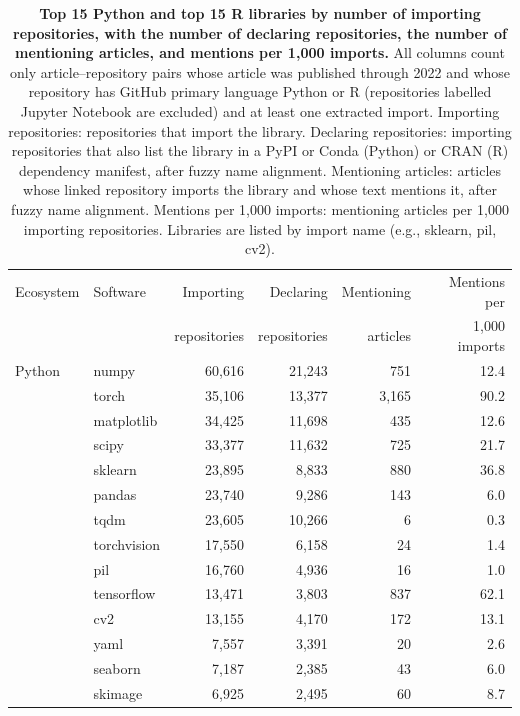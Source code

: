 \documentclass[pdflatex,sn-nature]{sn-jnl}%
\begin{document}
\begin{table}[ht]
\caption{\textbf{Top 15 Python and top 15 R libraries by number of importing repositories, with the number of declaring repositories, the number of mentioning articles, and mentions per 1,000 imports.} All columns count only article--repository pairs whose article was published through 2022 and whose repository has GitHub primary language Python or R (repositories labelled Jupyter Notebook are excluded) and at least one extracted import. Importing repositories: repositories that import the library. Declaring repositories: importing repositories that also list the library in a PyPI or Conda (Python) or CRAN (R) dependency manifest, after fuzzy name alignment. Mentioning articles: articles whose linked repository imports the library and whose text mentions it, after fuzzy name alignment. Mentions per 1,000 imports: mentioning articles per 1,000 importing repositories. Libraries are listed by import name (e.g., sklearn, pil, cv2).}\label{tab:topsoftware}
\begin{tabular}{@{}llrrrr@{}}
\toprule
Ecosystem & Software & Importing & Declaring & Mentioning & Mentions per \\
 & & repositories & repositories & articles & 1,000 imports \\
\midrule
Python & numpy & 60,616 & 21,243 & 751 & 12.4 \\
 & torch & 35,106 & 13,377 & 3,165 & 90.2 \\
 & matplotlib & 34,425 & 11,698 & 435 & 12.6 \\
 & scipy & 33,377 & 11,632 & 725 & 21.7 \\
 & sklearn & 23,895 & 8,833 & 880 & 36.8 \\
 & pandas & 23,740 & 9,286 & 143 & 6.0 \\
 & tqdm & 23,605 & 10,266 & 6 & 0.3 \\
 & torchvision & 17,550 & 6,158 & 24 & 1.4 \\
 & pil & 16,760 & 4,936 & 16 & 1.0 \\
 & tensorflow & 13,471 & 3,803 & 837 & 62.1 \\
 & cv2 & 13,155 & 4,170 & 172 & 13.1 \\
 & yaml & 7,557 & 3,391 & 20 & 2.6 \\
 & seaborn & 7,187 & 2,385 & 43 & 6.0 \\
 & skimage & 6,925 & 2,495 & 60 & 8.7 \\

\end{tabular}
\end{table}
\end{document}

